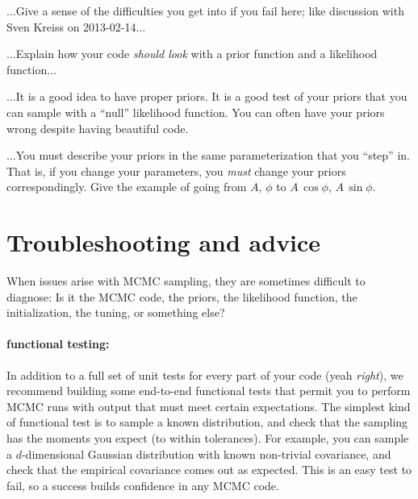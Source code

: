 \documentclass[12pt,twoside,pdftex]{article}
\begin{document}
...Give a sense of the difficulties you get into if you fail here; like
discussion with Sven Kreiss on 2013-02-14...

...Explain how your code \emph{should look} with a prior function and a likelihood function...

...It is a good idea to have proper priors.
It is a good test of your priors that you can sample with a ``null'' likelihood function.
You can often have your priors wrong despite having beautiful code.

...You must describe your priors in the same parameterization that you ``step'' in.
That is, if you change your parameters, you \emph{must} change your priors correspondingly.
Give the example of going from $A$, $\phi$ to $A\,\cos\phi$, $A\,\sin\phi$.

\section{Troubleshooting and advice}

When issues arise with MCMC sampling,
  they are sometimes difficult to diagnose:
Is it the MCMC code, the priors, the likelihood function,
  the initialization, the tuning, or something else?

\paragraph{functional testing:}
In addition to a full set of unit tests for every part of your code
  (yeah \emph{right}),
  we recommend building some end-to-end functional tests that permit you to perform MCMC
  runs with output that must meet certain expectations.
The simplest kind of functional test is to sample a known distribution,
  and check that the sampling has the moments you expect (to within tolerances).
For example, you can sample a $d$-dimensional Gaussian distribution with known non-trivial covariance,
  and check that the empirical covariance comes out as expected.
This is an easy test to fail, so a success builds confidence in any MCMC code.
\end{document}
